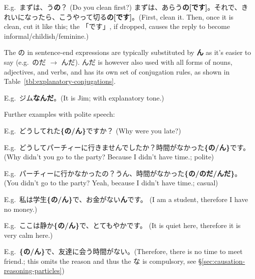 \documentclass[../nihongo-gakushuu-kyouzai.tex]{subfiles}
\begin{document}
\begin{itemize}
\begin{description}
        E.g.\ まずは、う\textbf{の}？ (Do you clean first?) まずは、あらう\textbf{の[です]}。それで、きれいになったら、こうやって切る\textbf{の[です]}。(First, clean it. Then, once it is clean, cut it like this; the 「です」, if dropped, causes the reply to become informal/childish/feminine.)

        The の in sentence-end expressions are typically substituted by \textbf{ん} as it's easier to say (e.g.\ のだ $\to$ んだ). んだ is however also used with all forms of nouns, adjectives, and verbs, and has its own set of conjugation rules, as shown in Table~\ref{tbl:explanatory-conjugations}.

        E.g.\ ジム\textbf{なんだ}。(It is Jim; with explanatory tone.)

        Further examples with polite speech:

        E.g.\ どうしてれた\textbf{\{の/ん\}}ですか？ (Why were you late?)


        E.g.\ どうしてパーチィーに行きませんでしたか？時間がなかった\textbf{\{の/ん\}}です。 (Why didn't you go to the party? Because I didn't have time.; polite)

        E.g.\ パーチィーに行かなかったの？うん、時間がなかった\textbf{\{の/のだ/んだ\}}。(You didn't go to the party? Yeah, because I didn't have time.; casual)

        E.g.\ 私は学生\textbf{\{の/ん\}}で、お金がない\textbf{ん}です。 (I am a student, therefore I have no money.)

        E.g.\ ここは静か\textbf{\{の/ん\}}で、とてもやかです。 (It is quiet here, therefore it is very calm here.)

        E.g.\ \textbf{\{の/ん\}}で、友達に会う時間がない。(Therefore, there is no time to meet friend.; this omits the reason and thus the な is compulsory, see \S\ref{sec:causation-reasoning-particles})
    \end{description}
\end{itemize}
\end{document}
